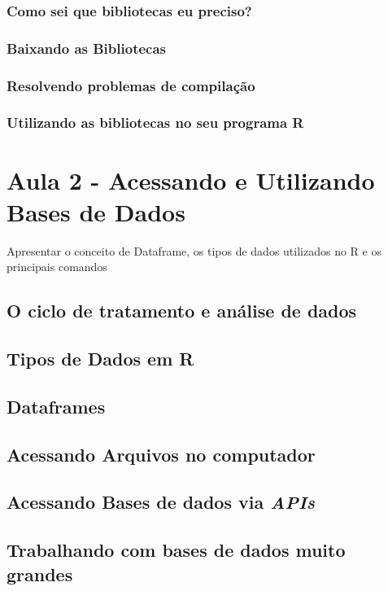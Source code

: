 \documentclass[12pt,a4paper,oneside]{erdc}
\begin{document}
\subsection{Como sei que bibliotecas eu preciso?}

\subsection{Baixando as Bibliotecas}

\subsection{Resolvendo problemas de compilação}

\subsection{Utilizando as bibliotecas no seu programa R}


\chapter{Aula 2 - Acessando e Utilizando Bases de Dados}

Apresentar o conceito de Dataframe, os tipos de dados utilizados no R e os principais comandos  

\section{O ciclo de tratamento e análise de dados}

\section{Tipos de Dados em R}

\section{Dataframes}

\section{Acessando Arquivos no computador}


\section{Acessando Bases de dados via \textit{APIs}}

\section{Trabalhando com bases de dados muito grandes}
\end{document}
